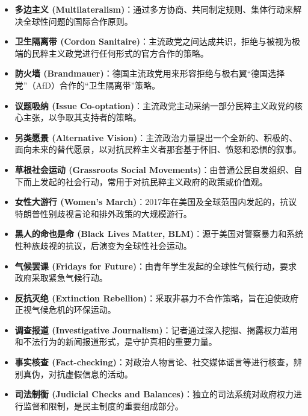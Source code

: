 \begin{itemize}
    \item \textbf{多边主义 (Multilateralism)}：通过多方协商、共同制定规则、集体行动来解决全球性问题的国际合作原则。

    \item \textbf{卫生隔离带 (Cordon Sanitaire)}：主流政党之间达成共识，拒绝与被视为极端的民粹主义政党进行任何形式的官方合作的策略。

    \item \textbf{防火墙 (Brandmauer)}：德国主流政党用来形容拒绝与极右翼“德国选择党”（AfD）合作的“卫生隔离带”策略。

    \item \textbf{议题吸纳 (Issue Co-optation)}：主流政党主动采纳一部分民粹主义政党的核心主张，以争取其支持者的策略。

    \item \textbf{另类愿景 (Alternative Vision)}：主流政治力量提出一个全新的、积极的、面向未来的替代愿景，以对抗民粹主义者那套基于怀旧、愤怒和恐惧的叙事。

    \item \textbf{草根社会运动 (Grassroots Social Movements)}：由普通公民自发组织、自下而上发起的社会行动，常用于对抗民粹主义政府的政策或价值观。

    \item \textbf{女性大游行 (Women's March)}：2017年在美国及全球范围内发起的，抗议特朗普性别歧视言论和排外政策的大规模游行。

    \item \textbf{黑人的命也是命 (Black Lives Matter, BLM)}：源于美国对警察暴力和系统性种族歧视的抗议，后演变为全球性社会运动。

    \item \textbf{气候罢课 (Fridays for Future)}：由青年学生发起的全球性气候行动，要求政府采取紧急气候行动。

    \item \textbf{反抗灭绝 (Extinction Rebellion)}：采取非暴力不合作策略，旨在迫使政府正视气候危机的环保运动。

    \item \textbf{调查报道 (Investigative Journalism)}：记者通过深入挖掘、揭露权力滥用和不法行为的新闻报道形式，是守护真相的重要力量。

    \item \textbf{事实核查 (Fact-checking)}：对政治人物言论、社交媒体谣言等进行核查，辨别真伪，对抗虚假信息的活动。

    \item \textbf{司法制衡 (Judicial Checks and Balances)}：独立的司法系统对政府权力进行监督和限制，是民主制度的重要组成部分。


\end{itemize}
